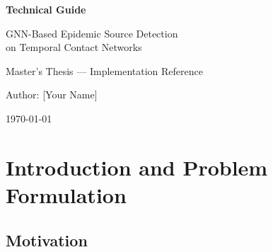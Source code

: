 \documentclass[12pt,a4paper]{report}
\begin{document}

\begin{titlepage}
  \centering
  \vspace*{2cm}
  {\LARGE\bfseries Technical Guide\par}
  \vspace{0.5cm}
  {\Large GNN-Based Epidemic Source Detection\\on Temporal Contact Networks\par}
  \vspace{1.5cm}
  {\large Master's Thesis — Implementation Reference\par}
  \vspace{0.5cm}
  {\large Author: [Your Name]\par}
  \vspace{0.5cm}
  {\large\today\par}
  \vspace{2cm}
  \begin{abstract}
    \noindent
    This document is a self-contained technical reference for the master's thesis
    project on graph neural network (GNN) based epidemic source detection on
    temporal contact networks. It covers every layer of the software stack: the
    stochastic SIR epidemic model and its C-based simulation engine, the five
    distinct graph representations derived from a temporal contact sequence, the
    five GNN architectures (StaticGNN, TemporalGNN, BacktrackingNetwork, DBGNN,
    and DAG-GNN), the training pipeline with its loss function and early-stopping
    scheme, the evaluation metrics, the non-ML baselines, and the experimental
    design including the two parameter sweeps. Mathematical derivations are given
    in full, code listings are drawn directly from the implementation, and the
    rationale behind every design decision is explained.
  \end{abstract}
  \vfill
\end{titlepage}

\tableofcontents
\clearpage

\chapter{Introduction and Problem Formulation}
\label{chap:intro}

\section{Motivation}
\end{document}
